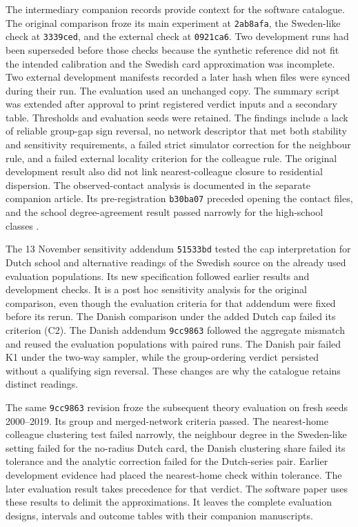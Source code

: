 The intermediary companion records provide context for the software catalogue. The original comparison froze its main experiment at \texttt{2ab8afa}, the Sweden-like check at \texttt{3339ced}, and the external check at \texttt{0921ca6}. Two development runs had been superseded before those checks because the synthetic reference did not fit the intended calibration and the Swedish card approximation was incomplete. Two external development manifests recorded a later hash when files were synced during their run. The evaluation used an unchanged copy. The summary script was extended after approval to print registered verdict inputs and a secondary table. Thresholds and evaluation seeds were retained. The findings include a lack of reliable group-gap sign reversal, no network descriptor that met both stability and sensitivity requirements, a failed strict simulator correction for the neighbour rule, and a failed external locality criterion for the colleague rule. The original development result also did not link nearest-colleague closure to residential dispersion. The observed-contact analysis is documented in the separate companion article. Its pre-registration \texttt{b30ba07} preceded opening the contact files, and the school degree-agreement result passed narrowly for the high-school classes \citep{almamunbuilt2026,almamunpredicting2026}.

The 13 November sensitivity addendum \texttt{51533bd} tested the cap interpretation for Dutch school and alternative readings of the Swedish source on the already used evaluation populations. Its new specification followed earlier results and development checks. It is a post hoc sensitivity analysis for the original comparison, even though the evaluation criteria for that addendum were fixed before its rerun. The Danish comparison under the added Dutch cap failed its criterion (C2). The Danish addendum \texttt{9cc9863} followed the aggregate mismatch and reused the evaluation populations with paired runs. The Danish pair failed K1 under the two-way sampler, while the group-ordering verdict persisted without a qualifying sign reversal. These changes are why the catalogue retains distinct readings.

The same \texttt{9cc9863} revision froze the subsequent theory evaluation on fresh seeds 2000--2019. Its group and merged-network criteria passed. The nearest-home colleague clustering test failed narrowly, the neighbour degree in the Sweden-like setting failed for the no-radius Dutch card, the Danish clustering share failed its tolerance and the analytic correction failed for the Dutch-series pair. Earlier development evidence had placed the nearest-home check within tolerance. The later evaluation result takes precedence for that verdict. The software paper uses these results to delimit the approximations. It leaves the complete evaluation designs, intervals and outcome tables with their companion manuscripts.

